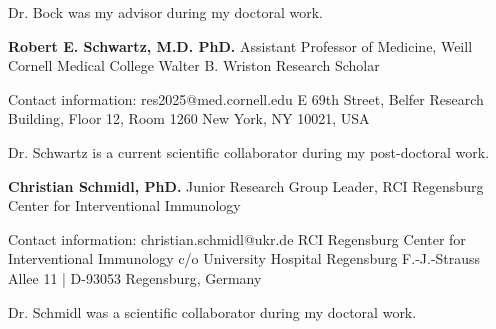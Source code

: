 \documentclass[11pt,a4paper,roman]{moderncv} %
\begin{document}
\begin{list}{--}{}
        Dr. Bock was my advisor during my doctoral work.\newline

    \item{}
        {\textbf{Robert E. Schwartz, M.D. PhD.}}\newline
        Assistant Professor of Medicine, Weill Cornell Medical College\newline
        Walter B. Wriston Research Scholar

        Contact information:\newline
        \> res2025@med.cornell.edu\newline
         E 69th Street, Belfer Research Building, Floor 12, Room 1260\newline
        \> New York, NY 10021, USA

        Dr. Schwartz is a current scientific collaborator during my post-doctoral work.\newline

    \item{}
        {\textbf{Christian Schmidl, PhD.}}\newline
        Junior Research Group Leader, RCI Regensburg Center for Interventional Immunology

        Contact information:\newline
        \> christian.schmidl@ukr.de\newline
        \> RCI Regensburg Center for Interventional Immunology c/o University Hospital Regensburg\newline
        \> F.-J.-Strauss Allee 11 | D-93053 Regensburg, Germany

        Dr. Schmidl was a scientific collaborator during my doctoral work.\newline

\end{list}
\end{document}
